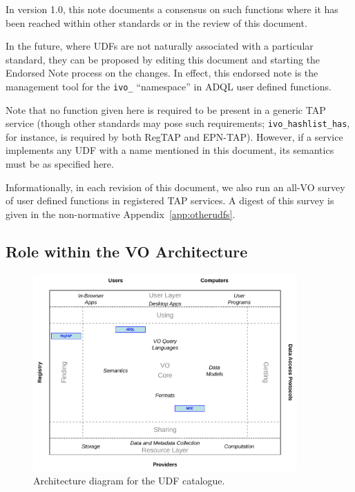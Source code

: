 \documentclass[11pt,a4paper]{ivoa}
\begin{document}
In version 1.0, this note documents a consensus
on such functions where it has been
reached within other standards or in the review of this document.

In the future, where UDFs are not naturally associated with a
particular standard, they can be proposed by editing this document and
starting the Endorsed Note process \citep{2017ivoa.spec.0517G} on the
changes.  In effect, this endorsed note is the management tool for
the \verb|ivo_| ``namespace'' in ADQL user defined functions.

Note that no function given here is required to be present in a generic
TAP service (though other standards may pose such requirements;
\verb|ivo_hashlist_has|, for instance, is required by both
RegTAP and EPN-TAP).  However, if a service implements any UDF with a
name mentioned in this document, its semantics must be as specified here.

Informationally, in each revision of this document, we also run an
all-VO survey of user defined functions in registered TAP services.  A
digest of this survey is given in the non-normative
Appendix~\ref{app:otherudfs}.

\subsection{Role within the VO Architecture}

\begin{figure}
\centering

\includegraphics[width=0.9\textwidth]{role_diagram.pdf}
\caption{Architecture diagram for the UDF catalogue.}
\label{fig:archdiag}
\end{figure}
\end{document}
